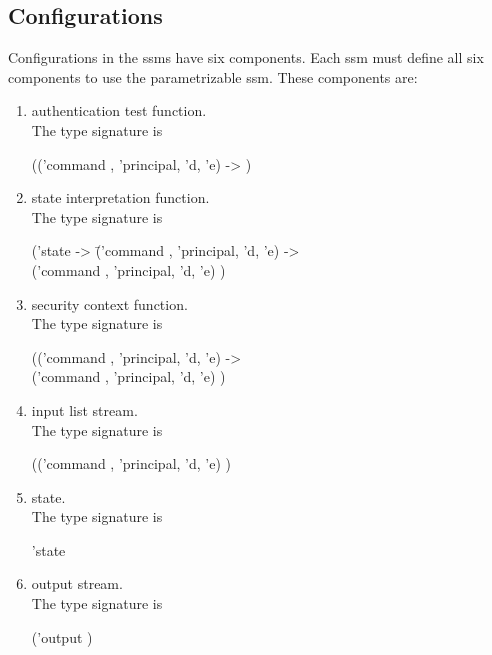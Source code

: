 \documentclass[../../main/main.tex]{subfiles}
\begin{document}
\subsection{Configurations}
Configurations in the \glspl{ssm} have six components.  Each \gls{ssm} must define all six components to use the parametrizable ssm.  These components are:
\begin{enumerate}
\item authentication test function.  \\
The type signature is 

\hspace{0.5cm}  (('command , 'principal, 'd, 'e)  -> )

\item state interpretation function.  \\
The type signature is
\begin{tabbing}
\hspace{0.5cm}('state -> \=('command , 'principal, 'd, 'e)   -> \\
				      \>('command , 'principal, 'd, 'e)  ) 
\end{tabbing}
\item security context function.  \\
The type signature is 

 \hspace{0.5cm}   (('command , 'principal, 'd, 'e)   -> \\
\hspace{0.5cm}    ('command , 'principal, 'd, 'e)  ) 

\item input list stream.  \\
The type signature is

 \hspace{0.5cm}  (('command , 'principal, 'd, 'e)   ) \

\item state.  \\
The type signature is

\hspace{0.5cm}   'state

\item output stream.  \\
The type signature is 

\hspace{0.5cm} ('output )
\end{enumerate}
\end{document}
